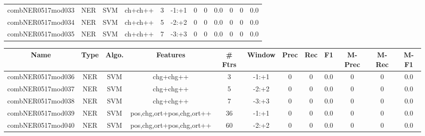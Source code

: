 \documentclass[a4paper]{article}
\begin{document}
\begin{landscape}
\begin{center}
\begin{tabular}{ |c|c|c|c|c|c|c|c|c|c|c|c|}
 
 	
 	\small{ combNER0517mod033 } & \small{ NER} & \small{  SVM }  & ch+ch++  &  3 &  \small{  -1:+1 }  &  0 & 0 & 0.0  &  0 & 0 & 0.0 \\
 	

 
 	
 	\small{ combNER0517mod034 } & \small{ NER} & \small{  SVM }  & ch+ch++  &  5 &  \small{  -2:+2 }  &  0 & 0 & 0.0  &  0 & 0 & 0.0 \\
 	

 
 	
 	\small{ combNER0517mod035 } & \small{ NER} & \small{  SVM }  & ch+ch++  &  7 &  \small{  -3:+3 }  &  0 & 0 & 0.0  &  0 & 0 & 0.0 \\
 	
 \hline
\end{tabular}
\end{center}




\begin{center}
\begin{tabular}{ |c|c|c|c|c|c|c|c|c|c|c|c|} 
 \hline
 	Name & Type & Algo. & Features & \# Ftrs & Window & Prec & Rec & F1 & M-Prec & M-Rec & M-F1\\
 \hline

 	

 
 	
 	\small{ combNER0517mod036 } & \small{ NER} & \small{  SVM }  & chg+chg++  &  3 &  \small{  -1:+1 }  &  0 & 0 & 0.0  &  0 & 0 & 0.0 \\
 	

 
 	
 	\small{ combNER0517mod037 } & \small{ NER} & \small{  SVM }  & chg+chg++  &  5 &  \small{  -2:+2 }  &  0 & 0 & 0.0  &  0 & 0 & 0.0 \\
 	

 
 	
 	\small{ combNER0517mod038 } & \small{ NER} & \small{  SVM }  & chg+chg++  &  7 &  \small{  -3:+3 }  &  0 & 0 & 0.0  &  0 & 0 & 0.0 \\
 	

 
 	
 	\small{ combNER0517mod039 } & \small{ NER} & \small{  SVM }  & pos,chg,ort+pos,chg,ort++  &  36 &  \small{  -1:+1 }  &  0 & 0 & 0.0  &  0 & 0 & 0.0 \\
 	

 
 	
 	\small{ combNER0517mod040 } & \small{ NER} & \small{  SVM }  & pos,chg,ort+pos,chg,ort++  &  60 &  \small{  -2:+2 }  &  0 & 0 & 0.0  &  0 & 0 & 0.0 \\
 	


\end{tabular}
\end{center}
\end{landscape}
\end{document}
